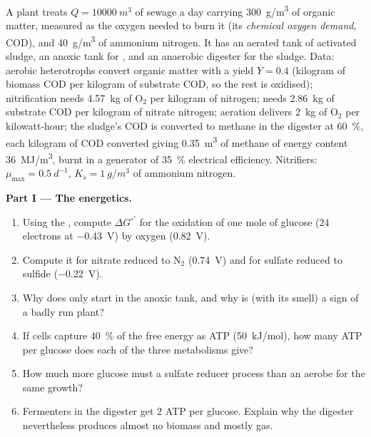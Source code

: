 \begin{problem}
\label{pb:b2:microbial-metabolism:1}
A plant treats $Q = \qty{10000}{m^3}$ of sewage a day carrying
\qty{300}{g/m^3} of organic matter, measured as the oxygen needed to
burn it (its \emph{chemical oxygen demand}, COD), and
\qty{40}{g/m^3} of ammonium nitrogen. It has an aerated tank of
activated sludge, an anoxic tank for , and an
anaerobic digester for the sludge. Data: aerobic heterotrophs
convert organic matter with a yield $Y = 0.4$ (kilogram of biomass
COD per kilogram of substrate COD, so the rest is oxidised);
nitrification needs \qty{4.57}{kg} of $\mathrm{O_2}$ per kilogram of
nitrogen;  needs \qty{2.86}{kg} of substrate COD per
kilogram of nitrate nitrogen; aeration delivers \qty{2}{kg} of
$\mathrm{O_2}$ per kilowatt-hour; the sludge's COD is converted to
methane in the digester at \qty{60}{\%}, each kilogram of COD
converted giving \qty{0.35}{m^3} of methane of energy content
\qty{36}{MJ/m^3}, burnt in a generator of \qty{35}{\%} electrical
efficiency. Nitrifiers: $\mu_{\max} = \qty{0.5}{d^{-1}}$, $K_s =
\qty{1}{g/m^3}$ of ammonium nitrogen.

\medskip
\noindent\textbf{Part I --- The energetics.}
\begin{enumerate}
  \item Using the , compute $\Delta G^{\circ\prime}$
        for the oxidation of one mole of glucose (24 electrons at
        \qty{-0.43}{V}) by oxygen (\qty{+0.82}{V}).
  \item Compute it for nitrate reduced to $\mathrm{N_2}$
        (\qty{+0.74}{V}) and for sulfate reduced to sulfide
        (\qty{-0.22}{V}).
  \item Why does  only start in the anoxic tank, and
        why is  (with its smell) a sign of a badly
        run plant?
  \item If cells capture \qty{40}{\%} of the free energy as ATP
        (\qty{50}{kJ/mol}), how many ATP per glucose does each of the
        three metabolisms give?
  \item How much more glucose must a sulfate reducer process than an
        aerobe for the same growth?
  \item Fermenters in the digester get 2 ATP per glucose. Explain why
        the digester nevertheless produces almost no biomass and
        mostly gas.
\end{enumerate}


\end{problem}
